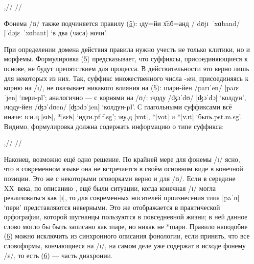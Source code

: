\ex[exno=5] \begingl[everygla=] \label{exmorphon5}
\gla \phonr{\phonfeat[l]{–low \\ –tense}}{\phonfeat[l]{+tense}}{{]}\textsubscript{корень}},//
\glft {\small где {]}\textsubscript{корень} обозначает границу корня слова.}//
\endgl \xe

Фонема /ʊ/ также подчиняется правилу (\hyperref[exmorphon5]{5}): \i{ду=йи х̌āб=анд} /ˈdʊjɪ~ˈxɑband/ [ˈdɔjɛ~ˈxɑbant] ‘в два (часа) ночи’.

При определении домена действия правила нужно учесть не только клитики, но и морфемы. Формулировка (\hyperref[exmorphon5]{5}) предсказывает, что суффиксы, присоединяющиеся к основе, не будут препятствием для процесса. В действительности это верно лишь для некоторых из них. Так, суффикс множественного числа -\i{ен}, присоединяясь к корню на /ɪ/, не оказывает никакого влияния на (\hyperref[exmorphon5]{5}): \i{пари-йен} /parɪˈen/ [paɾɛˈjen] ‘пери-{\sc pl}’; аналогично — с корнями на /ʊ/: \i{ҷоду} /ʤɔˈdʊ/ [ʤɔˈdɔ] ‘колдун’, \i{ҷоду-йен} /ʤɔˈdʊen/ [ʤɔdɔˈjen] ‘колдун-{\sc pl}’. С глагольными суффиксами всё иначе: \i{си.ц} [sɪʦ], *[sɛʦ] ‘идти.{\sc pf.f.sg}’; \i{ву.д} [vʊt], *[vot] и *[vɔt] ‘быть.{\sc pst.m.sg}’. Видимо, формулировка должна содержать информацию о типе суффикса:

\ex[exno=6] \begingl[everygla=] \label{exmorphon6}
\gla \phonr{\phonfeat[l]{–low \\ –tense}}{\phonfeat[l]{+tense}}{{]}\textsubscript{корень}}   {\oneof{\textsubscript{клитики~или неглагольные суффиксы} {[} \\ \#}},//
//
\endgl \xe

Наконец, возможно ещё одно решение. По крайней мере для фонемы /ɪ/ ясно, что в современном языке она не встречается в своём основном виде в конечной позиции. Это же с некоторыми оговорками верно и для /ʊ/. Если в середине XX~века, по описанию \parencite{sokolova1953}, ещё были ситуации, когда конечная /ɪ/ могла реализоваться как [ɪ], то для современных носителей произнесения типа [paˈɾɪ] ‘пери’ представляются неверными. Это же отображается в практической орфографии, которой шугнанцы пользуются в повседневной жизни; в ней данное слово могло бы быть записано как \i{паре}, но никак не *\i{пари}. Правило наподобие (\hyperref[exmorphon6]{6}) можно исключить из синхронного описания фонологии, если принять, что все словоформы, кончающиеся на /ɪ/, на самом деле уже содержат в исходе фонему /ɛ/, то есть (\hyperref[exmorphon6]{6}) — часть диахронии.

